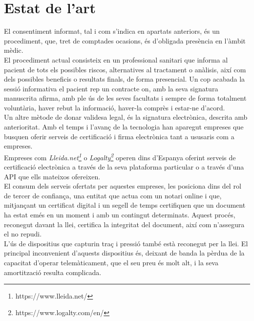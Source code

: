 \section{Estat de l'art}
\label{stateofart}
El consentiment informat, tal i com s'indica en apartats anteriors, és un procediment, que, tret de comptades ocasions, és d'obligada presència en l'àmbit mèdic.\\
\newline El procediment actual consisteix en un professional sanitari que informa al pacient de tots els possibles riscos, alternatives al tractament o anàlisis, així com dels possibles beneficis o resultats finals, de forma presencial. Un cop acabada la sessió informativa el pacient rep un contracte on, amb la seva signatura manuscrita afirma, amb ple ús de les seves facultats i sempre de forma totalment voluntària, haver rebut la informació, haver-la comprès i estar-ne d'acord.\\
\newline Un altre mètode de donar validesa legal, és la signatura electrònica, descrita amb anterioritat. Amb el temps i l'avanç de la tecnologia han aparegut empreses que busquen oferir serveis de certificació i firma electrònica tant a ususaris com a empreses.\\
\newline Empreses com \textit{Lleida.net\footnote{https://www.lleida.net/}} o \textit{Logalty\footnote{https://www.logalty.com/en/}} operen dins d'Espanya oferint serveis de certificació electrònica a través de la seva plataforma particular o a través d'una API que ells mateixos ofereixen.\\
\newline El consum dels serveis ofertats per aquestes empreses, les posiciona dins del rol de tercer de confiança, una entitat que actua com un notari online i que, mitjançant un certificat digital i un segell de temps certifiquen que un document ha estat emés en un moment i amb un contingut determinats. 
\newline Aquest procés, reconegut davant la llei, certifica la integritat del document, així com n'assegura el no repudi.\\
\newline L'ús de dispositius que capturin traç i pressió també està reconegut per la llei. El principal inconvenient d'aquests dispositius és, deixant de banda la pèrdua de la capacitat d'operar telemàticament, que el seu preu és molt alt, i la seva amortització resulta complicada.\\
